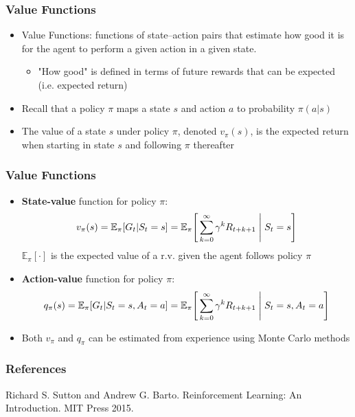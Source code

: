 \documentclass{beamer}
\begin{document}

\begin{frame}
\frametitle{Value Functions}
\begin{itemize}
\item Value Functions: functions of state--action pairs that estimate how good it is for the agent to perform a given action in a given state. 
   \begin{itemize}
   	\item "How good" is defined in terms of future rewards that can be expected (i.e. expected return)
      \end{itemize}
\item Recall that a policy $\pi$ maps a state $s$ and action $a$ to probability $\pi(a|s)$
\item The value of a state $s$ under policy $\pi$, denoted $v_\pi(s)$, is the expected return when starting in state $s$ and following $\pi$ thereafter

\end{itemize}
\end{frame}


\begin{frame}
\frametitle{Value Functions}
\begin{itemize}
\item \textbf{State-value} function for policy $\pi$:
\begin{equation}
v_\pi(s) = \mathbb{E}_\pi[G_t | S_t = s] = \mathbb{E}_\pi\Bigg[\sum_{k=0}^{\infty} \gamma^k R_{t+k+1} \Biggm\lvert S_t = s \Bigg]
\nonumber
\end{equation}
$\mathbb{E}_\pi[\cdot]$ is the expected value of a r.v. given the agent follows policy $\pi$
\item \textbf{Action-value} function for policy $\pi$:
\begin{equation}
q_\pi(s) = \mathbb{E}_\pi[G_t | S_t = s, A_t = a] = \mathbb{E}_\pi\Bigg[\sum_{k=0}^{\infty} \gamma^k R_{t+k+1} \Biggm\lvert S_t = s, A_t = a \Bigg]
\nonumber
\end{equation}
\item Both $v_\pi$ and $q_\pi$ can be estimated from experience using Monte Carlo methods
\end{itemize}
\end{frame}





\begin{frame}
\frametitle{References}

Richard S. Sutton and Andrew G. Barto. Reinforcement Learning: An Introduction. MIT Press 2015.

\end{frame}

\end{document}
